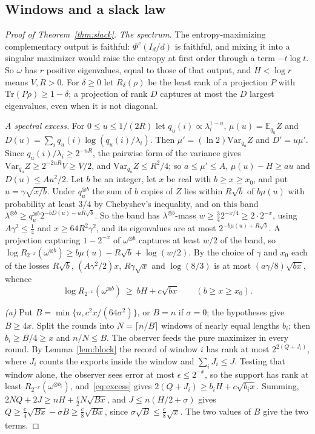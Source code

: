 \documentclass[11pt,a4paper]{article}
\theoremstyle{plain}
\theoremstyle{definition}
\theoremstyle{remark}
\begin{document}
\subsection{Windows and a slack law}

\begin{proof}[Proof of Theorem~\ref{thm:slack}]
\emph{The spectrum.} The entropy-maximizing complementary output is faithful: $\Phi^c(I_d/d)$ is faithful, and mixing it into a
singular maximizer would raise the entropy at first order through a term $-t\log t$. So $\omega$ has $r$ positive eigenvalues, equal
to those of that output, and $H<\log r$ means $V,R>0$. For $\delta\ge0$ let $R_\delta(\rho)$ be the least rank of a projection $P$ with
$\mathrm{Tr}(P\rho)\ge1-\delta$; a projection of rank $D$ captures at most the $D$ largest eigenvalues, even when it is not diagonal.

\emph{A spectral excess.} For $0\le u\le1/(2R)$ let $q_u(i)\propto\lambda_i^{1-u}$, $\mu(u)=\mathbb E_{q_u}Z$ and
$D(u)=\sum_iq_u(i)\log(q_u(i)/\lambda_i)$. Then $\mu'=(\ln2)\mathrm{Var}_{q_u}Z$ and $D'=u\mu'$. Since $q_u(i)/\lambda_i\ge2^{-uR}$, the pairwise form
of the variance gives $\mathrm{Var}_{q_u}Z\ge2^{-2uR}V\ge V/2$, and $\mathrm{Var}_{q_u}Z\le R^2/4$; so $a\le\mu'\le A$, $\mu(u)-H\ge au$ and
$D(u)\le Au^2/2$. Let $b$ be an integer, let $x$ be real with $b\ge x\ge x_0$, and put $u=\gamma\sqrt{x/b}$. Under $q_u^{\otimes b}$ the sum of $b$ copies of $Z$ lies
within $R\sqrt b$ of $b\mu(u)$ with probability at least $3/4$ by Chebyshev's inequality, and on this band
$\lambda^{\otimes b}\ge q_u^{\otimes b}2^{-bD(u)-uR\sqrt b}$. So the band has $\lambda^{\otimes b}$-mass $w\ge\frac34 2^{-x/4}\ge2\cdot2^{-x}$, using
$A\gamma^2\le\frac14$ and $x\ge64R^2\gamma^2$, and its eigenvalues are at most $2^{-b\mu(u)+R\sqrt b}$. A projection capturing $1-2^{-x}$ of
$\omega^{\otimes b}$ captures at least $w/2$ of the band, so $\log R_{2^{-x}}(\omega^{\otimes b})\ge b\mu(u)-R\sqrt b+\log(w/2)$. By the choice of
$\gamma$ and $x_0$ each of the losses $R\sqrt b$, $(A\gamma^2/2)x$, $R\gamma\sqrt x$ and $\log(8/3)$ is at most $(a\gamma/8)\sqrt{bx}$, whence
\begin{equation}\label{eq:excess}
\log R_{2^{-x}}(\omega^{\otimes b})\ \ge\ bH+c\sqrt{bx}\qquad(b\ge x\ge x_0).
\end{equation}

\emph{(a)} Put $B=\min\{n,c^2x/(64\sigma^2)\}$, or $B=n$ if $\sigma=0$; the hypotheses give $B\ge4x$. Split the rounds into
$N=\lceil n/B\rceil$ windows of nearly equal lengths $b_i$; then $b_i\ge B/4\ge x$ and $n/N\le B$. The observer feeds the pure
maximizer in every round. By Lemma~\ref{lem:block} the record of window $i$ has rank at most $2^{2(Q+J_i)}$, where $J_i$ counts the
exports inside the window and $\sum_iJ_i\le J$. Testing that window alone, the observer sees error at most $\epsilon\le2^{-x}$, so
the support has rank at least $R_{2^{-x}}(\omega^{\otimes b_i})$, and~\eqref{eq:excess} gives $2(Q+J_i)\ge b_iH+c\sqrt{b_ix}$. Summing,
$2NQ+2J\ge nH+\frac c2N\sqrt{Bx}$, and $J\le n(H/2+\sigma)$ gives $Q\ge\frac c4\sqrt{Bx}-\sigma B\ge\frac c8\sqrt{Bx}$, since $\sigma\sqrt B\le\frac c8\sqrt x$.
The two values of $B$ give the two terms.


\end{proof}
\end{document}
